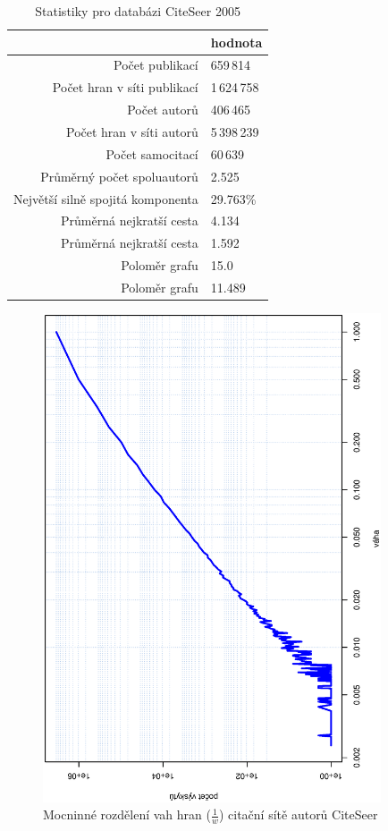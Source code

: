 \documentclass{bakalarka}
\begin{document}
\begin{table}[!ht]
\begin{center}
\begin{tabular}{r|l}
\toprule
& hodnota \\
\midrule
Počet publikací & 659\,814 \\
Počet hran v síti publikací & 1\,624\,758 \\
Počet autorů & 406\,465 \\
Počet hran v síti autorů & 5\,398\,239 \\
Počet samocitací & 60\,639 \\
Průměrný počet spoluautorů & 2.525 \\
Největší silně spojitá komponenta & 29.763\% \\
Průměrná nejkratší cesta\footnotemark[1] & 4.134 \\
Průměrná nejkratší cesta\footnotemark[2] & 1.592 \\
Poloměr grafu\footnotemark[1] & 15.0   \\
Poloměr grafu\footnotemark[2] & 11.489 \\
\bottomrule
\end{tabular}
\caption{Statistiky pro databázi CiteSeer 2005}
\label{tab:citeseerstat}
\end{center}
\end{table}

\begin{figure}[!ht]
\centering
	\includegraphics[width=10cm,angle=270]{ewd_citeseer.eps}
	\caption{Mocninné rozdělení vah hran ($\frac{1}{w}$) citační sítě autorů CiteSeer}
\end{figure}
\end{document}
